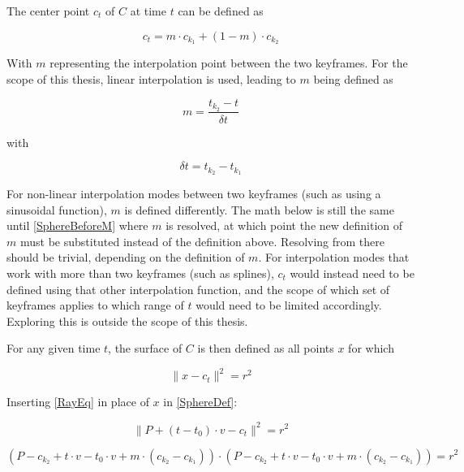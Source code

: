 The center point \(c_t\) of \(C\) at time \(t\) can be defined as

\begin{equation}
    c_t = m \cdot c_{k_1} + (1-m) \cdot c_{k_2}
\end{equation}

With \(m\) representing the interpolation point between the two keyframes.
For the scope of this thesis, linear interpolation is used, leading to \(m\) being defined as

\begin{equation}\label{MDef}
    m = \frac{t_{k_2} - t}{\delta t}
\end{equation}

with

\begin{equation}
    \delta t = t_{k_2} - t_{k_1}
\end{equation}

For non-linear interpolation modes between two keyframes (such as using a sinusoidal function),
\(m\) is defined differently. The math below is still the same until \eqref{SphereBeforeM} where \(m\) is resolved,
at which point the new definition of \(m\) must be substituted instead of the definition above.
Resolving from there should be trivial, depending on the definition of \(m\).
\newline
For interpolation modes that work with more than two keyframes (such as splines),
\(c_t\) would instead need to be defined using that other interpolation function,
and the scope of which set of keyframes applies to which range of \(t\) would need to be limited accordingly.
Exploring this is outside the scope of this thesis.
\newline

For any given time \(t\), the surface of \(C\) is then defined as all points \(x\) for which

\begin{equation}\label{SphereDef}
    \|x-c_t\|^2 = r^2
\end{equation}

Inserting \eqref{RayEq} in place of \(x\) in \eqref{SphereDef}:

\begin{equation}
    \|P + (t - t_0) \cdot v - c_t\|^2 = r^2
\end{equation}

\begin{equation*}
    (P - c_{k_2} + t \cdot v - t_0 \cdot v + m \cdot (c_{k_2} - c_{k_1})) \cdot (P - c_{k_2} + t \cdot v - t_0 \cdot v + m \cdot (c_{k_2} - c_{k_1})) = r^2
\end{equation*}

